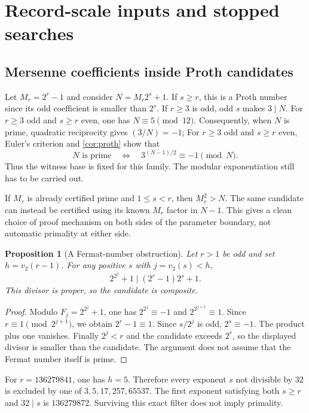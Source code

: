 \documentclass[11pt,a4paper]{article}
\newtheorem{proposition}[theorem]{Proposition}
\theoremstyle{definition}\newtheorem{definition}[theorem]{Definition}
\theoremstyle{remark}\newtheorem{remark}[theorem]{Remark}
\begin{document}
\section{Record-scale inputs and stopped searches}
\label{sec:records}

\subsection{Mersenne coefficients inside Proth candidates}

Let $M_r=2^r-1$ and consider $N=M_r2^s+1$. If $s\ge r$, this is a Proth
number since its odd coefficient is smaller than $2^s$. If $r\ge3$ is odd,
odd $s$ makes $3\mid N$. For $r\ge3$ odd and $s\ge r$ even, one has
$N\equiv5\pmod{12}$.
Consequently, when $N$ is prime, quadratic reciprocity gives $(3/N)=-1$;
For $r\ge3$ odd and $s\ge r$ even, Euler's criterion and
\cref{cor:proth} show that
\[
 N\text{ is prime}\quad\Longleftrightarrow\quad
 3^{(N-1)/2}\equiv-1\pmod N.
\]
Thus the witness base is fixed for this family. The modular exponentiation
still has to be carried out.

If $M_r$ is already certified prime and $1\le s<r$, then $M_r^2>N$.
The same candidate can instead be certified using its known $M_r$ factor in
$N-1$. This gives a clean choice of proof mechanism on both sides of the
parameter boundary, not automatic primality at either side.

\begin{proposition}[A Fermat-number obstruction]\label{prop:fermat-filter}
Let $r>1$ be odd and set $h=v_2(r-1)$. For any positive $s$ with
$j=v_2(s)<h$,
\[
 2^{2^j}+1\mid (2^r-1)2^s+1.
\]
This divisor is proper, so the candidate is composite.
\end{proposition}
\begin{proof}
Modulo $F_j=2^{2^j}+1$, one has $2^{2^j}\equiv-1$ and
$2^{2^{j+1}}\equiv1$. Since $r\equiv1\pmod{2^{j+1}}$, we obtain
$2^r-1\equiv1$. Since $s/2^j$ is odd, $2^s\equiv-1$. The product plus
one vanishes. Finally $2^j<r$ and the candidate exceeds $2^r$, so the
displayed divisor is smaller than the candidate. The argument does not
assume that the Fermat number itself is prime.
\end{proof}

For $r=136279841$, one has $h=5$. Therefore every exponent $s$ not divisible
by $32$ is excluded by one of $3,5,17,257,65537$. The first exponent satisfying
both $s\ge r$ and $32\mid s$ is $136279872$. Surviving this exact filter
does not imply primality.
\end{document}
